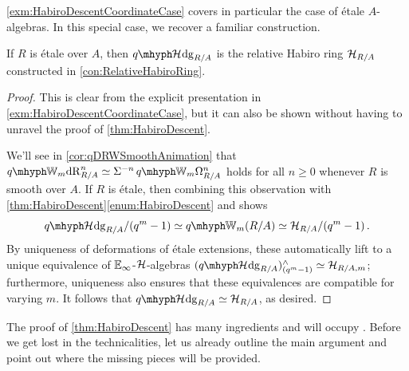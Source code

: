 \documentclass[DIV=12,numbers=enddot,leqno,bibliography=totoc]{scrartcl}
\begin{document}
	\cref{exm:HabiroDescentCoordinateCase} covers in particular the case of étale $A$-algebras. In this special case, we recover a familiar construction.
	\begin{cor}\label{cor:ComparisonWithGSWZ2}
		If $R$ is étale over $A$, then $\qHhodge_{R/A}$ is the relative Habiro ring $\mathcal{H}_{R/A}$ constructed in \cref{con:RelativeHabiroRing}.
	\end{cor}
	\begin{proof}
		This is clear from the explicit presentation in \cref{exm:HabiroDescentCoordinateCase}, but it can also be shown without having to unravel the proof of \cref{thm:HabiroDescent}.
		
		We'll see in \cref{cor:qDRWSmoothAnimation} that $\qIW_m\deRham_{R/A}^n\simeq \Sigma^{-n}\qIW_m\Omega_{R/A}^n$ holds for all $n\geqslant 0$ whenever $R$ is smooth over $A$. If $R$ is étale, then combining this observation with \cref{thm:HabiroDescent}\cref{enum:HabiroDescent} and \cite[Proposition~]{qWitt} shows 
		\begin{equation*}
			\qHhodge_{R/A}/(q^m-1)\simeq \qIW_m(R/A)\simeq \Hh_{R/A}/(q^m-1)\,.
		\end{equation*}
		By uniqueness of deformations of étale extensions, these automatically lift to a unique equivalence of $\mathbb{E}_\infty$-$\mathcal{H}$-algebras $(\qHhodge_{R/A})_{(q^m-1)}^\complete\simeq \Hh_{R/A,  m}$; furthermore, uniqueness also ensures that these equivalences are compatible for varying $m$. It follows that $\qHhodge_{R/A}\simeq \Hh_{R/A}$, as desired.
	\end{proof}
	The proof of \cref{thm:HabiroDescent} has many ingredients and will occupy . Before we get lost in the technicalities, let us already outline the main argument and point out where the missing pieces will be provided.
\end{document}
